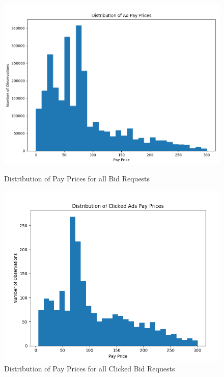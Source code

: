 \documentclass{sig-alternate-05-2015}
\begin{document}
\begin{figure}
   \begin{minipage}{0.5\textwidth}
     \centering
     \includegraphics[width=1\linewidth]{payPriceDist.png}
     \caption{Distribution of Pay Prices for all Bid Requests}
     \label{payPriceDist}
   \end{minipage}\hfill
   \begin {minipage}{0.5\textwidth}
     \centering
     \includegraphics[width=1\textwidth]{payPriceDistClicked.png}
     \caption{Distribution of Pay Prices for all Clicked Bid Requests}
     \label{payPriceDistClicked}
   \end{minipage}
   \begin {minipage}{0.5\textwidth}

\end{minipage}
\end{figure}
\end{document}
